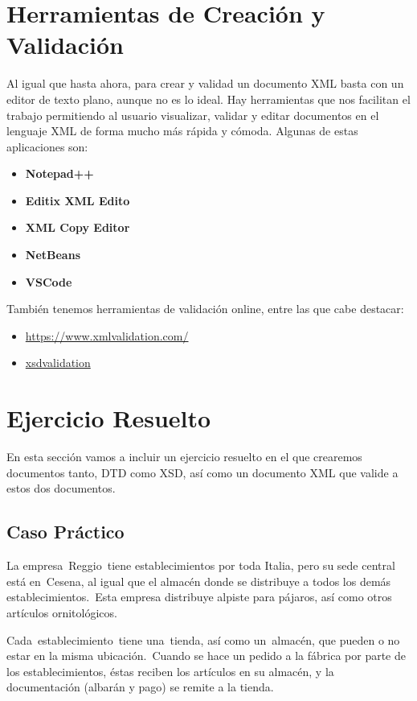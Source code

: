 \section{Herramientas de Creación y Validación}
Al igual que hasta ahora, para crear y validad un documento XML basta con un editor de texto plano, aunque no es lo ideal. Hay herramientas que nos facilitan el trabajo permitiendo al usuario visualizar, validar y editar documentos en el lenguaje XML de forma mucho más rápida y cómoda. Algunas de estas aplicaciones son:

\begin{itemize}
    \item \textbf{Notepad++}
    \item \textbf{Editix XML Edito}
    \item \textbf{XML Copy Editor}
    \item \textbf{NetBeans}
    \item \textbf{VSCode}
\end{itemize}

También tenemos herramientas de validación online, entre las que cabe destacar:

\begin{itemize}
    \item \url{https://www.xmlvalidation.com/}
    \item \url{xsdvalidation}
\end{itemize}

\section{Ejercicio Resuelto}
En esta sección vamos a incluir un ejercicio resuelto en el que crearemos documentos tanto, DTD como XSD, así como un documento XML que valide a estos dos documentos.

\subsection{Caso Práctico}
La empresa Reggio tiene establecimientos por toda Italia, pero su sede central está en Cesena, al igual que el almacén donde se distribuye a todos los demás establecimientos. Esta empresa distribuye alpiste para pájaros, así como otros artículos ornitológicos.

Cada establecimiento tiene una tienda, así como un almacén, que pueden o no estar en la misma ubicación. Cuando se hace un pedido a la fábrica por parte de los establecimientos, éstas reciben los artículos en su almacén, y la documentación (albarán y pago) se remite a la tienda.

